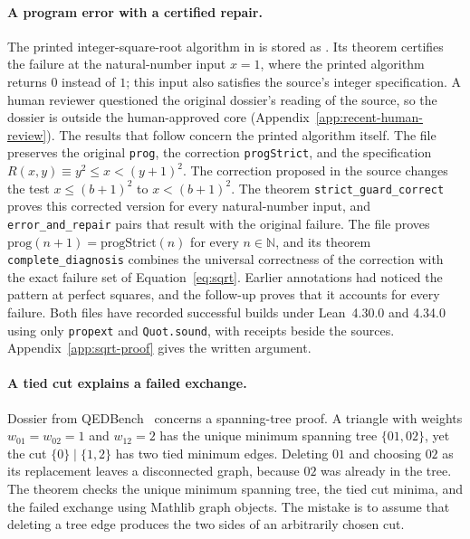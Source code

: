 \paragraph{A program error with a certified repair.}
The printed integer-square-root algorithm in  is stored as . Its theorem  certifies the failure at the natural-number input $x=1$, where the printed algorithm returns $0$ instead of $1$; this input also satisfies the source's integer specification. A human reviewer questioned the original dossier's reading of the source, so the dossier is outside the human-approved core (Appendix~\ref{app:recent-human-review}). The results that follow concern the printed algorithm itself. The file  preserves the original \texttt{prog}, the correction \texttt{progStrict}, and the specification $R(x,y)\equiv y^2\le x<(y+1)^2$. The correction proposed in the source changes the test $x\le(b+1)^2$ to $x<(b+1)^2$. The theorem \texttt{strict\_guard\_correct} proves this corrected version for every natural-number input, and \texttt{error\_and\_repair} pairs that result with the original failure. The file  proves $\mathrm{prog}(n+1)=\mathrm{progStrict}(n)$ for every $n\in\mathbb N$, and its theorem \texttt{complete\_diagnosis} combines the universal correctness of the correction with the exact failure set of Equation~\eqref{eq:sqrt}. Earlier annotations had noticed the pattern at perfect squares, and the follow-up proves that it accounts for every failure. Both files have recorded successful builds under Lean~4.30.0 and 4.34.0 using only \texttt{propext} and \texttt{Quot.sound}, with receipts beside the sources. Appendix~\ref{app:sqrt-proof} gives the written argument.

\paragraph{A tied cut explains a failed exchange.}
Dossier  from QEDBench~\citep{gonzalez2026qedbench} concerns a spanning-tree proof. A triangle with weights $w_{01}=w_{02}=1$ and $w_{12}=2$ has the unique minimum spanning tree $\{01,02\}$, yet the cut $\{0\}\mid\{1,2\}$ has two tied minimum edges. Deleting $01$ and choosing $02$ as its replacement leaves a disconnected graph, because $02$ was already in the tree. The theorem  checks the unique minimum spanning tree, the tied cut minima, and the failed exchange using Mathlib graph objects. The mistake is to assume that deleting a tree edge produces the two sides of an arbitrarily chosen cut.

